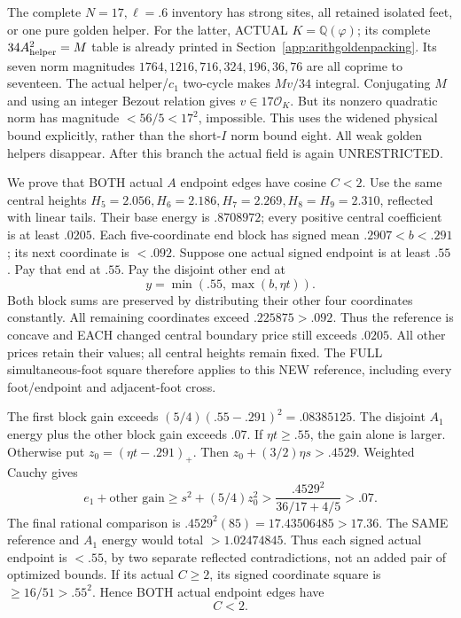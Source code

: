\documentclass[11pt]{article}
\begin{document}
The complete \(N=17,\ell=.6\) inventory
has strong sites, all retained isolated
feet, or one pure golden helper.
For the latter, ACTUAL \(K=\mathbb Q(\varphi)\);
its complete \(34A_{\rm helper}^2=M\)
table is already printed in
Section~\ref{app:arithgoldenpacking}.
Its seven norm magnitudes
\(1764,1216,716,324,196,36,76\) are
all coprime to seventeen.
The actual helper/\(c_1\) two-cycle
makes \(Mv/34\) integral.
Conjugating \(M\) and using an integer
Bezout relation gives \(v\in17\mathcal O_K\).
But its nonzero quadratic norm has magnitude
\(<56/5<17^2\), impossible.
This uses the widened physical bound
explicitly, rather than the short-\(I\)
norm bound eight.
All weak golden helpers disappear.
After this branch the actual field is
again UNRESTRICTED.

We prove that BOTH actual \(A\) endpoint
edges have cosine \(C<2\).
Use the same central heights
\(H_5=2.056,H_6=2.186,H_7=2.269,H_8=H_9=2.310\),
reflected with linear tails.
Their base energy is \(.8708972\);
every positive central coefficient is
at least \(.0205\).
Each five-coordinate end block has signed
mean \(.2907<b<.291\); its next coordinate
is \(<.092\).
Suppose one actual signed endpoint is
at least \(.55\).
Pay that end at \(.55\).
Pay the disjoint other end at
\[
                         y=\min(.55,\max(b,\eta t)).
\]
Both block sums are preserved by distributing
their other four coordinates constantly.
All remaining coordinates exceed
\(.225875>.092\).
Thus the reference is concave and EACH
changed central boundary price still
exceeds \(.0205\).
All other prices retain their values;
all central heights remain fixed.
The FULL simultaneous-foot square therefore
applies to this NEW reference, including
every foot/endpoint and adjacent-foot cross.

The first block gain exceeds
\((5/4)(.55-.291)^2=.08385125\).
The disjoint \(A_1\) energy plus the other
block gain exceeds \(.07\).
If \(\eta t\ge.55\), the gain alone is
larger.
Otherwise put \(z_0=(\eta t-.291)_+\).
Then \(z_0+(3/2)\eta s>.4529\).
Weighted Cauchy gives
\[
 e_1+\text{other gain}\ge s^2+(5/4)z_0^2
       >{\frac{.4529^2}{36/17+4/5}}>.07 .
\]
The final rational comparison is
\(.4529^2(85)=17.43506485>17.36\).
The SAME reference and \(A_1\) energy
would total \(>1.02474845\).
Thus each signed actual endpoint is
\(<.55\), by two separate reflected
contradictions, not an added pair of
optimized bounds.
If its actual \(C\ge2\), its signed
coordinate square is \(\ge16/51>.55^2\).
Hence BOTH actual endpoint edges have
\[
                                      C<2 .
\tag{A16r1C}\label{eq:arithA16rankonecutoff}
\]
\end{document}
